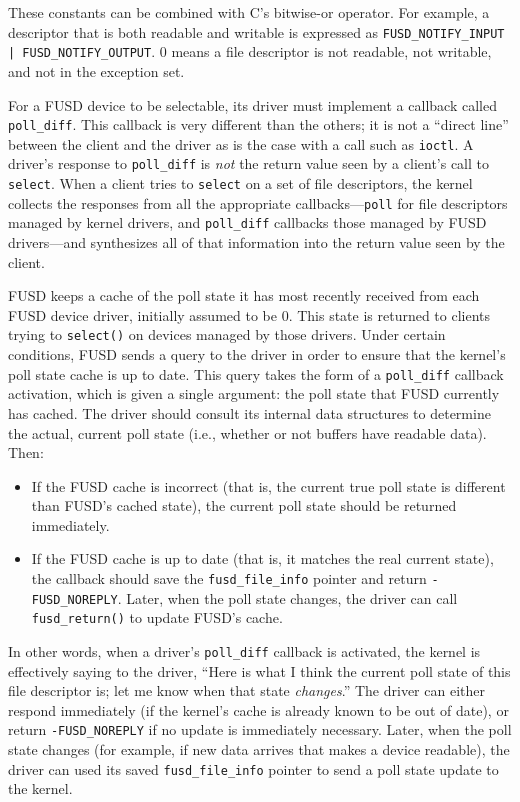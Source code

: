 \documentclass{article}
\begin{document}
These constants can be combined with C's bitwise-or operator.  For
example, a descriptor that is both readable and writable is expressed
as {\tt FUSD\_NOTIFY\_INPUT | FUSD\_NOTIFY\_OUTPUT}.  0 means a file
descriptor is not readable, not writable, and not in the exception
set.

For a FUSD device to be selectable, its driver must implement a
callback called {\tt poll\_diff}.  This callback is very different
than the others; it is not a ``direct line'' between the client and
the driver as is the case with a call such as {\tt ioctl}.  A driver's
response to {\tt poll\_diff} is {\em not} the return value seen by a
client's call to {\tt select}.  When a client tries to {\tt select} on
a set of file descriptors, the kernel collects the responses from all
the appropriate callbacks---{\tt poll} for file descriptors managed by
kernel drivers, and {\tt poll\_diff} callbacks those managed by FUSD
drivers---and synthesizes all of that information into the return
value seen by the client.

FUSD keeps a cache of the poll state it has most recently received
from each FUSD device driver, initially assumed to be 0.  This state
is returned to clients trying to {\tt select()} on devices managed by
those drivers.  Under certain conditions, FUSD sends a query to the
driver in order to ensure that the kernel's poll state cache is up to
date.  This query takes the form of a {\tt poll\_diff} callback
activation, which is given a single argument: the poll state that FUSD
currently has cached.  The driver should consult its internal data
structures to determine the actual, current poll state (i.e., whether
or not buffers have readable data).  Then:
\begin{itemize}
\item If the FUSD cache is incorrect (that is, the current true poll
state is different than FUSD's cached state), the current poll state
should be returned immediately.
\item If the FUSD cache is up to date (that is, it matches the real
current state), the callback should save the {\tt fusd\_file\_info}
pointer and return {\tt -FUSD\_NOREPLY}.  Later, when the poll
state changes, the driver can call {\tt fusd\_return()} to update
FUSD's cache.
\end{itemize}

In other words, when a driver's {\tt poll\_diff} callback is
activated, the kernel is effectively saying to the driver, ``Here is
what I think the current poll state of this file descriptor is; let me
know when that state {\em changes}.''  The driver can either respond
immediately (if the kernel's cache is already known to be out of
date), or return {\tt -FUSD\_NOREPLY} if no update is immediately
necessary.  Later, when the poll state changes (for example, if new
data arrives that makes a device readable), the driver can used its
saved {\tt fusd\_file\_info} pointer to send a poll state update to
the kernel.
\end{document}
